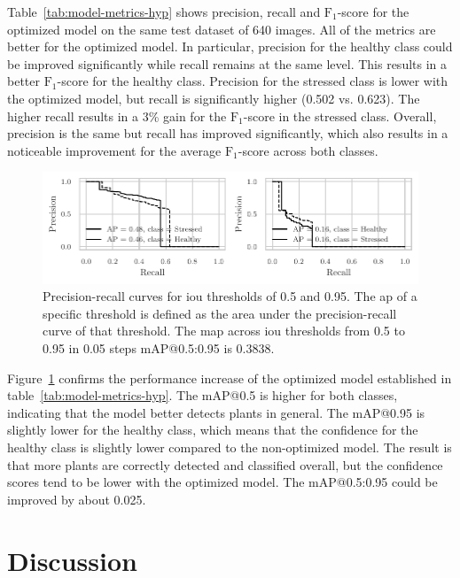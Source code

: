 \documentclass[draft,final]{vutinfth} %
\begin{document}
Table~\ref{tab:model-metrics-hyp} shows precision, recall and
$\mathrm{F}_1$-score for the optimized model on the same test dataset
of 640 images. All of the metrics are better for the optimized
model. In particular, precision for the healthy class could be
improved significantly while recall remains at the same level. This
results in a better $\mathrm{F}_1$-score for the healthy
class. Precision for the stressed class is lower with the optimized
model, but recall is significantly higher (0.502 vs. 0.623). The
higher recall results in a 3\% gain for the $\mathrm{F}_1$-score in
the stressed class. Overall, precision is the same but recall has
improved significantly, which also results in a noticeable improvement
for the average $\mathrm{F}_1$-score across both classes.

\begin{figure}
  \centering
  \includegraphics{graphics/APModel-model-original-relabeled.pdf}
  \caption[Optimized aggregate model AP@0.5 and
  AP@0.95.]{Precision-recall curves for \gls{iou} thresholds of 0.5
    and 0.95. The \gls{ap} of a specific threshold is defined as the
    area under the precision-recall curve of that threshold. The
    \gls{map} across \gls{iou} thresholds from 0.5 to 0.95 in 0.05
    steps \textsf{mAP}@0.5:0.95 is 0.3838.}
  \label{fig:aggregate-ap-hyp}
\end{figure}

Figure~\ref{fig:aggregate-ap-hyp} confirms the performance increase of
the optimized model established in
table~\ref{tab:model-metrics-hyp}. The \textsf{mAP}@0.5 is higher for
both classes, indicating that the model better detects plants in
general. The \textsf{mAP}@0.95 is slightly lower for the healthy
class, which means that the confidence for the healthy class is
slightly lower compared to the non-optimized model. The result is that
more plants are correctly detected and classified overall, but the
confidence scores tend to be lower with the optimized model. The
\textsf{mAP}@0.5:0.95 could be improved by about 0.025.

\section{Discussion}
\label{sec:discussion}
\end{document}
